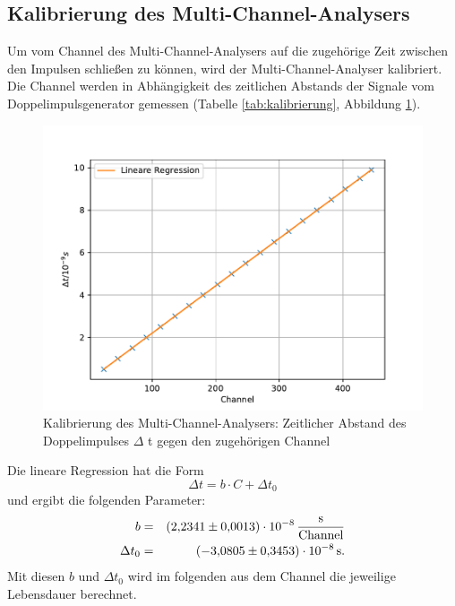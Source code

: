 \subsection{Kalibrierung des Multi-Channel-Analysers}
Um vom Channel des Multi-Channel-Analysers auf die zugehörige Zeit zwischen den Impulsen schließen zu können, wird der Multi-Channel-Analyser kalibriert.
Die Channel werden in Abhängigkeit des zeitlichen Abstands der Signale vom Doppelimpulsgenerator gemessen (Tabelle \ref{tab:kalibrierung}, Abbildung \ref{fig:kalibrierung}).

\begin{figure}[h!]
  \centering
  \includegraphics[width=\textwidth]{figkalibrierung.pdf}
  \caption{Kalibrierung des Multi-Channel-Analysers: Zeitlicher Abstand des Doppelimpulses $\Delta$ t gegen den zugehörigen Channel}
  \label{fig:kalibrierung}
\end{figure}
Die lineare Regression hat die Form
\begin{equation*}
  \Delta t = b \cdot C + \Delta t_{0}
\end{equation*}
und ergibt die folgenden Parameter:
\begin{align*}
  b             &=&  \SI{ 2.2341 \pm 0.0013 e-8}{\frac{s}{Channel}}  \\
  \Delta t_{0}  &=&  \SI{-3.0805 \pm 0.3453 e-8}{s}.  \\
\end{align*}
Mit diesen $b$ und $\Delta t_{0}$ wird im folgenden aus dem Channel die jeweilige Lebensdauer berechnet.
\FloatBarrier

